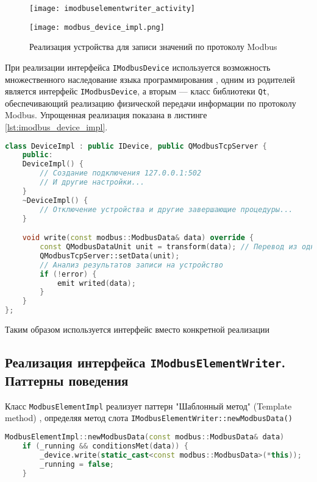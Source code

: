\begin{center}
    \begin{figure}
        \texttt{[image: imodbuselementwriter\_activity]}
        \caption{}\label{fig:imodbuselementwriter_activity}
    \end{figure}
\end{center}

\begin{center}
    \begin{figure}
        \texttt{[image: modbus\_device\_impl.png]}
        \caption{Реализация устройства для записи значений по протоколу Modbus}\label{fig:modbus_device_imp}
    \end{figure}
\end{center}
При реализации интерфейса \texttt{IModbusDevice} используется возможность множественного наследование языка программирования \cpp,
одним из родителей является интерфейс \texttt{IModbusDevice},
а вторым --- класс библиотеки \texttt{Qt}, обеспечивающий реализацию физической передачи информации по протоколу Modbus.
Упрощенная реализация показана в листинге \ref{lst:imodbus_device_impl}.
\begin{lstlisting}[language=C++,caption=Простейшая реализация \texttt{IModbusDevice} устройства,label=lst:imodbus_device_impl]
class DeviceImpl : public IDevice, public QModbusTcpServer {
    public:
    DeviceImpl() {
        // Создание подключения 127.0.0.1:502
        // И другие настройки...
    }
    ~DeviceImpl() {
        // Отключение устройства и другие завершающие процедуры...
    }

    void write(const modbus::ModbusData& data) override {
        const QModbusDataUnit unit = transform(data); // Перевод из одно формата в другой
        QModbusTcpServer::setData(unit);
        // Анализ результатов записи на устройство
        if (!error) {
            emit writed(data);
        }
    }
};
\end{lstlisting}
Таким образом используется интерфейс вместо конкретной реализации \cite{book:pattern:head_first}



\subsection{Реализация интерфейса \texttt{IModbusElementWriter}. Паттерны поведения}
Класс \texttt{ModbusElementImpl} реализует паттерн "Шаблонный метод" (Template method) \cite{book:pattern:band_of_4},
определяя метод слота \texttt{IModbusElementWriter::newModbusData()}
\begin{lstlisting}[language=C++]
ModbusElementImpl::newModbusData(const modbus::ModbusData& data)
    if (_running && conditionsMet(data)) {
        _device.write(static_cast<const modbus::ModbusData>(*this));
        _running = false;
    }
\end{lstlisting}


